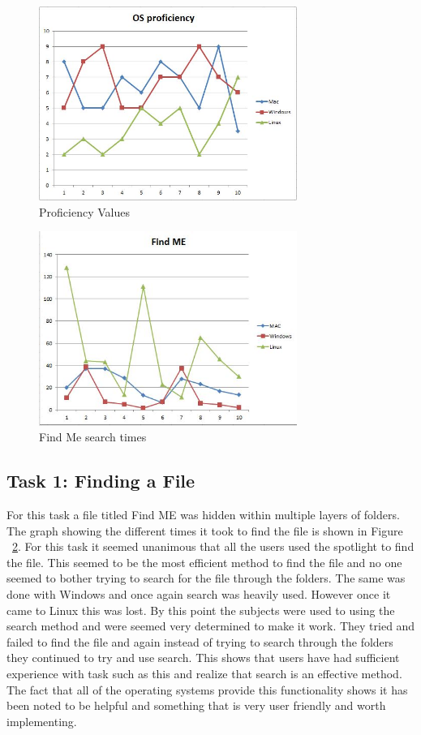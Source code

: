 \documentclass[11pt]{article}
\begin{document}
\begin{figure}[h!]
  \centering
    \includegraphics[width=0.75\textwidth]{./Images/Proficiency}
  \caption{Proficiency Values}
 \label{Proficiency}
\end{figure}

\begin{figure}[h!]
  \centering
    \includegraphics[width=0.75\textwidth]{./Images/Find_ME}
  \caption{Find Me search times}
 \label{Find}
\end{figure}


\subsection{Task 1: Finding a File}
For this task a file titled Find ME was hidden within multiple layers of folders. The graph showing the different times it took to find the file is shown in Figure ~\ref{Find}. For this task it seemed unanimous that all the users used the spotlight to find the file. This seemed to be the most efficient method to find the file and no one seemed to bother trying to search for the file through the folders. The same was done with Windows and once again search was heavily used. However once it came to Linux this was lost. By this point the subjects were used to using the search method and were seemed very determined to make it work. They tried and failed to find the file and again instead of trying to search through the folders they continued to try and use search. This shows that users have had sufficient experience with task such as this and realize that search is an effective method. The fact that all of the operating systems provide this functionality shows it has been noted to be helpful and something that is very user friendly and worth implementing.
\end{document}
